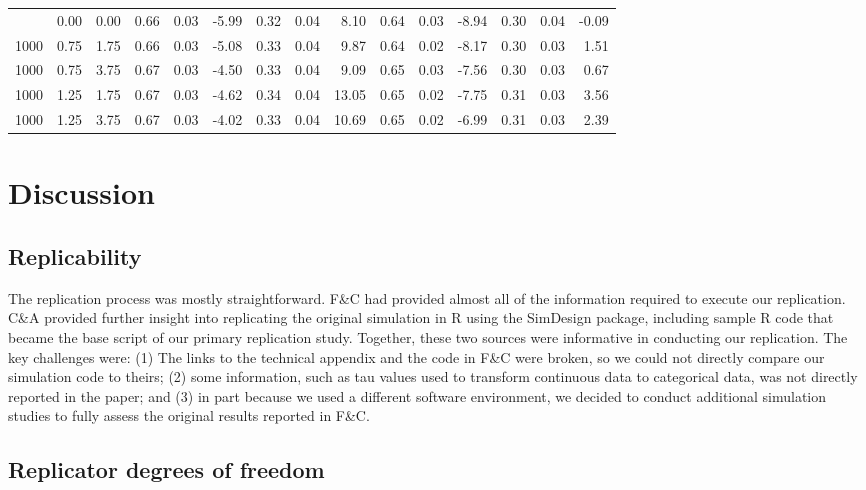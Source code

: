 \documentclass[10,a4paperpaper,]{article}
\begin{document}
\begin{table}
{\begin{tabular}[t]{rrrrrrrrrrrrrrr}
\addlinespace
1000 & 0.00 & 0.00 & 0.66 & 0.03 & -5.99 & 0.32 & 0.04 & 8.10 & 0.64 & 0.03 & -8.94 & 0.30 & 0.04 & -0.09\\
1000 & 0.75 & 1.75 & 0.66 & 0.03 & -5.08 & 0.33 & 0.04 & 9.87 & 0.64 & 0.02 & -8.17 & 0.30 & 0.03 & 1.51\\
1000 & 0.75 & 3.75 & 0.67 & 0.03 & -4.50 & 0.33 & 0.04 & 9.09 & 0.65 & 0.03 & -7.56 & 0.30 & 0.03 & 0.67\\
1000 & 1.25 & 1.75 & 0.67 & 0.03 & -4.62 & 0.34 & 0.04 & 13.05 & 0.65 & 0.02 & -7.75 & 0.31 & 0.03 & 3.56\\
1000 & 1.25 & 3.75 & 0.67 & 0.03 & -4.02 & 0.33 & 0.04 & 10.69 & 0.65 & 0.02 & -6.99 & 0.31 & 0.03 & 2.39\\
\bottomrule
\end{tabular}}
\end{table}

\FloatBarrier
\section{Discussion}

\subsection{Replicability}

The replication process was mostly straightforward. F\&C had provided
almost all of the information required to execute our replication. C\&A
provided further insight into replicating the original simulation in R
using the SimDesign package, including sample R code that became the
base script of our primary replication study. Together, these two
sources were informative in conducting our replication. The key
challenges were: (1) The links to the technical appendix and the code in
F\&C were broken, so we could not directly compare our simulation code
to theirs; (2) some information, such as tau values used to transform
continuous data to categorical data, was not directly reported in the
paper; and (3) in part because we used a different software environment,
we decided to conduct additional simulation studies to fully assess the
original results reported in F\&C.

\subsection{Replicator degrees of freedom}
\end{document}
